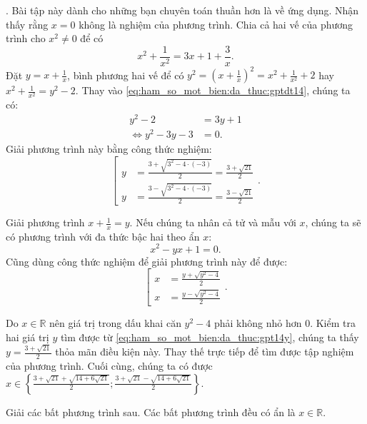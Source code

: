 . Bài tập này dành cho những bạn chuyên toán thuần hơn là về ứng dụng. Nhận thấy rằng $x = 0$ không là nghiệm của phương trình. Chia cả hai vế của phương trình cho $x^2 \neq 0$ để có 
\begin{equation}
   x^2 + \frac{1}{x^2} = 3x + 1 + \frac{3}{x}. 
   \label{eq:ham_so_mot_bien:da_thuc:gptdt14}
\end{equation}
Đặt $y = x + \frac{1}{x}$, bình phương hai vế để có $y^2 = \left(x + \frac{1}{x}\right)^2 = x^2 + \frac{1}{x^2} + 2$ hay $x^2 + \frac{1}{x^2} = y^2 - 2$. Thay vào \ref{eq:ham_so_mot_bien:da_thuc:gptdt14}, chúng ta có:
\begin{align*}
   y^2 - 2 &= 3y + 1 \\
   \iff y^2 - 3y - 3 &= 0.
\end{align*}
Giải phương trình này bằng công thức nghiệm:
\begin{equation}   
   \left[
      \begin{aligned}
         y &= \frac{3 + \sqrt{3^2 - 4 \cdot (-3)}}{2} = \frac{3 + \sqrt{21}}{2} \\
         y &= \frac{3 - \sqrt{3^2 - 4 \cdot (-3)}}{2} = \frac{3 - \sqrt{21}}{2}
      \end{aligned}
   \right..\label{eq:ham_so_mot_bien:da_thuc:gpt14y}
\end{equation}

Giải phương trình $x + \frac{1}{x} = y$. Nếu chúng ta nhân cả tử và mẫu với $x$, chúng ta sẽ có phương trình với đa thức bậc hai theo ẩn $x$: $$x^2 - yx + 1 = 0.$$ Cũng dùng công thức nghiệm để giải phương trình này để được:
$$
\left[
   \begin{aligned}
      x &= \frac{y + \sqrt{y^2 - 4}}{2} \\
      x &= \frac{y - \sqrt{y^2 - 4}}{2}
   \end{aligned}
\right..
$$

Do $x \in \mathbb{R}$ nên giá trị trong dấu khai căn $y^2 - 4$ phải không nhỏ hơn $0$. Kiểm tra hai giá trị $y$ tìm được từ \ref{eq:ham_so_mot_bien:da_thuc:gpt14y}, chúng ta thấy $y = \frac{3 + \sqrt{21}}{2}$ thỏa mãn điều kiện này. Thay thế trực tiếp để tìm được tập nghiệm của phương trình. Cuối cùng, chúng ta có được $x \in \displaystyle\left\{\frac{3+\sqrt{21}+\sqrt{14 + 6\sqrt{21}}}{2}; \frac{3+\sqrt{21}-\sqrt{14 + 6\sqrt{21}}}{2}\right\}$.

\exercise Giải các bất phương trình sau. Các bất phương trình đều có ẩn là $x \in \mathbb{R}$.

